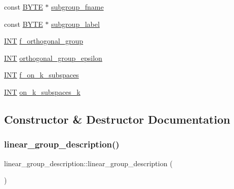\begin{DoxyCompactItemize}
const \mbox{\hyperlink{galois_8h_ab6cc7b4aeb6ea31aba2b3fbfc83ff5e6}{B\+Y\+TE}} $\ast$ \mbox{\hyperlink{classlinear__group__description_a1aa06c1fc14c0aeef15681f47cb99d5d}{subgroup\+\_\+fname}}
\item 
const \mbox{\hyperlink{galois_8h_ab6cc7b4aeb6ea31aba2b3fbfc83ff5e6}{B\+Y\+TE}} $\ast$ \mbox{\hyperlink{classlinear__group__description_a6c536be0db66a116893edbd611896974}{subgroup\+\_\+label}}
\item 
\mbox{\hyperlink{galois_8h_a09fddde158a3a20bd2dcadb609de11dc}{I\+NT}} \mbox{\hyperlink{classlinear__group__description_a5c78efaa89cf488bf5f7e148d86ac70f}{f\+\_\+orthogonal\+\_\+group}}
\item 
\mbox{\hyperlink{galois_8h_a09fddde158a3a20bd2dcadb609de11dc}{I\+NT}} \mbox{\hyperlink{classlinear__group__description_a436c41be37062df21ffb6821e3710843}{orthogonal\+\_\+group\+\_\+epsilon}}
\item 
\mbox{\hyperlink{galois_8h_a09fddde158a3a20bd2dcadb609de11dc}{I\+NT}} \mbox{\hyperlink{classlinear__group__description_aa6b11d2f8359254b1f92049e30d860bf}{f\+\_\+on\+\_\+k\+\_\+subspaces}}
\item 
\mbox{\hyperlink{galois_8h_a09fddde158a3a20bd2dcadb609de11dc}{I\+NT}} \mbox{\hyperlink{classlinear__group__description_a4a251135b4e57e86a8c9c94a6c9890d5}{on\+\_\+k\+\_\+subspaces\+\_\+k}}
\end{DoxyCompactItemize}


\subsection{Constructor \& Destructor Documentation}
\mbox{\label{classlinear__group__description_a430ec5360d9d73795a78b754d649bf17}} 
\subsubsection{\texorpdfstring{linear\+\_\+group\+\_\+description()}{linear\_group\_description()}}
{\footnotesize\ttfamily linear\+\_\+group\+\_\+description\+::linear\+\_\+group\+\_\+description (\begin{DoxyParamCaption}{ }\end{DoxyParamCaption})}

